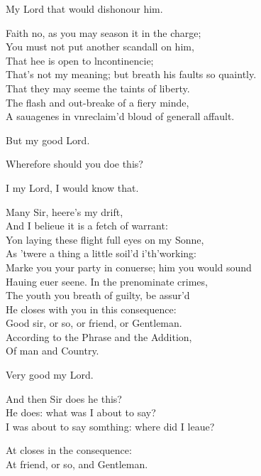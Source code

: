 \documentclass[a5paper,DIV=calc,11pt]{scrbook}
\begin{document}
\begin{drama*}
    \reynspeaks My Lord that would dishonour him.
    
    \polspeaks Faith no, as you may season it in the charge;\\
    You must not put another scandall on him,\\
    That hee is open to lncontinencie;\\
    That's not my meaning; but breath his faults so quaintly.\\
    That they may seeme the taints of liberty.\\
    The flash and out-breake of a fiery minde,\\
    A sauagenes in vnreclaim'd bloud of generall affault.
    
    \reynspeaks But my good Lord.
    
    \polspeaks Wherefore should you doe this?
    
    \reynspeaks I my Lord, I would know that.
    
    \polspeaks Many Sir, heere's my drift,\\
    And I belieue it is a fetch of warrant:\\
    Yon laying these flight full eyes on my Sonne,\\
    As 'twere a thing a little soil'd i'th'working:\\
    Marke you your party in conuerse; him you would sound\\
    Hauing euer seene. In the prenominate crimes,\\
    The youth you breath of guilty, be assur'd\\
    He closes with you in this consequence:\\
    Good sir, or so, or friend, or Gentleman.\\
    According to the Phrase and the Addition,\\
    Of man and Country.
    
    \reynspeaks Very good my Lord.
    
    \polspeaks And then Sir does he this?\\
    He does: what was I about to say?\\
    I was about to say somthing: where did I leaue?
    
    \reynspeaks At closes in the consequence:\\
    At friend, or so, and Gentleman.
    

\end{drama*}
\end{document}

